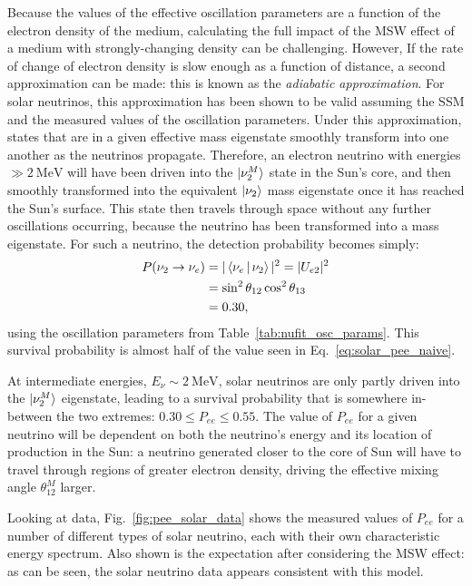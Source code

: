 Because the values of the effective oscillation parameters are a function of the electron density of the medium, calculating the full impact of the MSW effect of a medium with strongly-changing density can be challenging. However, If the rate of change of electron density is slow enough as a function of distance, a second approximation can be made: this is known as the \textit{adiabatic approximation}. For solar neutrinos, this approximation has been shown to be valid assuming the SSM and the measured values of the oscillation parameters. Under this approximation, states that are in a given effective mass eigenstate smoothly transform into one another as the neutrinos propagate. Therefore, an electron neutrino with energies $\gg\SI{2}{\MeV}$ will have been driven into the $\ket{\nu_{2}^{M}}$ state in the Sun's core, and then smoothly transformed into the equivalent $\ket{\nu_{2}}$ mass eigenstate once it has reached the Sun's surface. This state then travels through space without any further oscillations occurring, because the neutrino has been transformed into a mass eigenstate. For such a neutrino, the detection probability becomes simply:
\begin{align}
    P(\nu_{2}\to\nu_{e}) &= |\Braket{\nu_{e}|\nu_{2}}|^{2} = |U_{e2}|^{2}\\
                         &= \sin^{2}\theta_{12}{}\cos^{2}\theta_{13}\\
                         &= 0.30,
\end{align}
using the oscillation parameters from Table~\ref{tab:nufit_osc_params}. This survival probability is almost half of the value seen in Eq.~\ref{eq:solar_pee_naive}.

At intermediate energies, $E_{\nu}\sim\SI{2}{\MeV}$, solar neutrinos are only partly driven into the $\ket{\nu_{2}^{M}}$ eigenstate, leading to a survival probability that is somewhere in-between the two extremes: $0.30\leq P_{ee} \leq 0.55$. The value of $P_{ee}$ for a given neutrino will be dependent on both the neutrino's energy and its location of production in the Sun: a neutrino generated closer to the core of Sun will have to travel through regions of greater electron density, driving the effective mixing angle $\theta_{12}^{M}$ larger.

Looking at data, Fig.~\ref{fig:pee_solar_data} shows the measured values of $P_{ee}$ for a number of different types of solar neutrino, each with their own characteristic energy spectrum. Also shown is the expectation after considering the MSW effect: as can be seen, the solar neutrino data appears consistent with this model.

